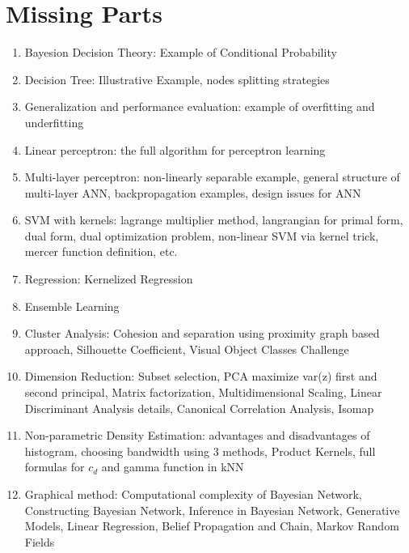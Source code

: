 \chapter{Missing Parts}

\begin{enumerate}
    \item Bayesion Decision Theory: Example of Conditional Probability
    \item Decision Tree: Illustrative Example, nodes splitting strategies
    \item Generalization and performance evaluation: example of overfitting and underfitting 
    \item Linear perceptron: the full algorithm for perceptron learning
    \item Multi-layer perceptron: non-linearly separable example, general structure of multi-layer ANN, backpropagation examples, design issues for ANN
    \item SVM with kernels: lagrange multiplier method, langrangian for primal form, dual form, dual optimization problem, non-linear SVM via kernel trick, mercer function definition, etc.
    \item Regression: Kernelized Regression
    \item Ensemble Learning
    \item Cluster Analysis: Cohesion and separation using proximity graph based approach, Silhouette Coefficient, Visual Object Classes Challenge
    \item Dimension Reduction: Subset selection, PCA maximize var(z) first and second principal, Matrix factorization, Multidimensional Scaling, Linear Discriminant Analysis details, Canonical Correlation Analysis, Isomap
    \item Non-parametric Density Estimation: advantages and disadvantages of histogram, choosing bandwidth using 3 methods, Product Kernels, full formulas for $c_d$ and gamma function in kNN
    \item Graphical method: Computational complexity of Bayesian Network, Constructing Bayesian Network, Inference in Bayesian Network, Generative Models, Linear Regression, Belief Propagation and Chain, Markov Random Fields
\end{enumerate}